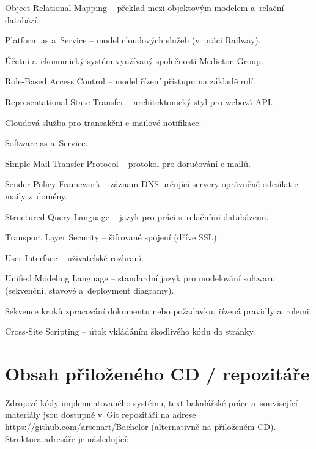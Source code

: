 \documentclass[
  a4paper,          %
  11pt,             %
  oneside,          %
  openany           %
]{report}
\begin{document}
\begin{description}[leftmargin=3.5cm, style=nextline]
  \item[ORM] Object-Relational Mapping -- překlad mezi objektovým modelem a~relační databází.
  \item[PaaS] Platform as a~Service -- model cloudových služeb (v~práci Railway).
  \item[Pohoda] Účetní a~ekonomický systém využívaný společností Medicton Group.
  \item[RBAC] Role-Based Access Control -- model řízení přístupu na základě rolí.
  \item[REST] Representational State Transfer -- architektonický styl pro webová API.
  \item[Resend] Cloudová služba pro transakční e-mailové notifikace.
  \item[SaaS] Software as a~Service.
  \item[SMTP] Simple Mail Transfer Protocol -- protokol pro doručování e-mailů.
  \item[SPF] Sender Policy Framework -- záznam DNS určující servery oprávněné odesílat e-maily z~domény.
  \item[SQL] Structured Query Language -- jazyk pro práci s~relačními databázemi.
  \item[TLS] Transport Layer Security -- šifrované spojení (dříve SSL).
  \item[UI] User Interface -- uživatelské rozhraní.
  \item[UML] Unified Modeling Language -- standardní jazyk pro modelování softwaru (sekvenční, stavové a~deployment diagramy).
  \item[Workflow] Sekvence kroků zpracování dokumentu nebo požadavku, řízená pravidly a~rolemi.
  \item[XSS] Cross-Site Scripting -- útok vkládáním škodlivého kódu do stránky.
\end{description}


\chapter{Obsah přiloženého CD / repozitáře}
\label{app:cd}

Zdrojové kódy implementovaného systému, text bakalářské práce a~související
materiály jsou dostupné v~Git repozitáři na adrese
\url{https://github.com/arsenart/Bachelor} (alternativně na přiloženém CD).
Struktura adresáře je následující:
\end{document}
